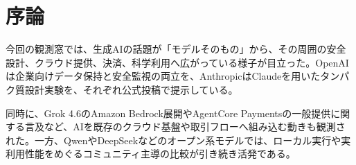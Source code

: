 \section{序論}
今回の観測窓では、生成AIの話題が「モデルそのもの」から、その周囲の安全設計、クラウド提供、決済、科学利用へ広がっている様子が目立った。OpenAIは企業向けデータ保持と安全監視の両立を、AnthropicはClaudeを用いたタンパク質設計実験を、それぞれ公式投稿で提示している。

同時に、Grok 4.6のAmazon Bedrock展開やAgentCore Paymentsの一般提供に関する言及など、AIを既存のクラウド基盤や取引フローへ組み込む動きも観測された。一方、QwenやDeepSeekなどのオープン系モデルでは、ローカル実行や実利用性能をめぐるコミュニティ主導の比較が引き続き活発である。
